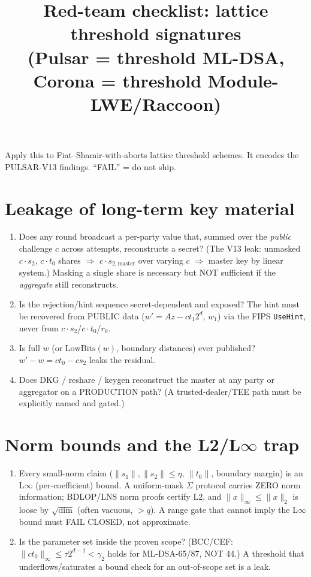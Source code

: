 \documentclass[11pt]{article}
\title{Red-team checklist: lattice threshold signatures\\(Pulsar = threshold ML-DSA, Corona = threshold Module-LWE/Raccoon)}
\date{}
\begin{document}
\maketitle
\noindent Apply this to Fiat--Shamir-with-aborts lattice threshold schemes. It
encodes the PULSAR-V13 findings. ``FAIL'' = do not ship.

\section{Leakage of long-term key material}
\begin{enumerate}[leftmargin=*]
  \item Does any round broadcast a per-party value that, summed over the
    \emph{public} challenge $c$ across attempts, reconstructs a secret? (The
    V13 leak: unmasked $c\!\cdot\!s_2$, $c\!\cdot\!t_0$ shares $\Rightarrow$
    $c\!\cdot\!s_{2,\mathrm{master}}$ over varying $c$ $\Rightarrow$ master
    key by linear system.) Masking a single share is necessary but NOT
    sufficient if the \emph{aggregate} still reconstructs.
  \item Is the rejection/hint sequence secret-dependent and exposed? The hint
    must be recovered from PUBLIC data ($w' = A z - c t_1 2^d$, $w_1$) via the
    FIPS \texttt{UseHint}, never from $c\!\cdot\!s_2$/$c\!\cdot\!t_0$/$r_0$.
  \item Is full $w$ (or $\mathrm{LowBits}(w)$, boundary distances) ever
    published? $w' - w = c t_0 - c s_2$ leaks the residual.
  \item Does DKG / reshare / keygen reconstruct the master at any party or
    aggregator on a PRODUCTION path? (A trusted-dealer/TEE path must be
    explicitly named and gated.)
\end{enumerate}

\section{Norm bounds and the L2/L$\infty$ trap}
\begin{enumerate}[leftmargin=*]
  \item Every small-norm claim ($\|s_1\|,\|s_2\|\le\eta$, $\|t_0\|$, boundary
    margin) is an L$\infty$ (per-coefficient) bound. A uniform-mask $\Sigma$
    protocol carries ZERO norm information; BDLOP/LNS norm proofs certify L2,
    and $\|x\|_\infty\le\|x\|_2$ is loose by $\sqrt{\dim}$ (often vacuous,
    $>q$). A range gate that cannot imply the L$\infty$ bound must FAIL CLOSED,
    not approximate.
  \item Is the parameter set inside the proven scope? (BCC/CEF: $\|c t_0\|_\infty
    \le \tau 2^{d-1} < \gamma_2$ holds for ML-DSA-65/87, NOT 44.) A threshold
    that underflows/saturates a bound check for an out-of-scope set is a leak.
\end{enumerate}
\end{document}
